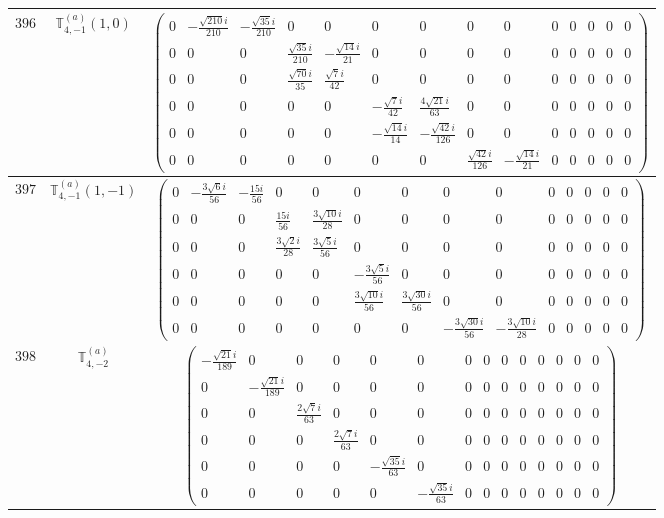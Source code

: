 \documentclass[fleqn,8pt,landscape]{jsarticle}
\begin{document}
\begin{center}
\begin{longtable}{ccc}
$ 396 $ & $ \mathbb{T}_{4,-1}^{(a)}(1,0) $ & $ \begin{pmatrix} 0 & - \frac{\sqrt{210} i}{210} & - \frac{\sqrt{35} i}{210} & 0 & 0 & 0 & 0 & 0 & 0 & 0 & 0 & 0 & 0 & 0 \\ 0 & 0 & 0 & \frac{\sqrt{35} i}{210} & - \frac{\sqrt{14} i}{21} & 0 & 0 & 0 & 0 & 0 & 0 & 0 & 0 & 0 \\ 0 & 0 & 0 & \frac{\sqrt{70} i}{35} & \frac{\sqrt{7} i}{42} & 0 & 0 & 0 & 0 & 0 & 0 & 0 & 0 & 0 \\ 0 & 0 & 0 & 0 & 0 & - \frac{\sqrt{7} i}{42} & \frac{4 \sqrt{21} i}{63} & 0 & 0 & 0 & 0 & 0 & 0 & 0 \\ 0 & 0 & 0 & 0 & 0 & - \frac{\sqrt{14} i}{14} & - \frac{\sqrt{42} i}{126} & 0 & 0 & 0 & 0 & 0 & 0 & 0 \\ 0 & 0 & 0 & 0 & 0 & 0 & 0 & \frac{\sqrt{42} i}{126} & - \frac{\sqrt{14} i}{21} & 0 & 0 & 0 & 0 & 0 \end{pmatrix} $ \\ \hline
$ 397 $ & $ \mathbb{T}_{4,-1}^{(a)}(1,-1) $ & $ \begin{pmatrix} 0 & - \frac{3 \sqrt{6} i}{56} & - \frac{15 i}{56} & 0 & 0 & 0 & 0 & 0 & 0 & 0 & 0 & 0 & 0 & 0 \\ 0 & 0 & 0 & \frac{15 i}{56} & \frac{3 \sqrt{10} i}{28} & 0 & 0 & 0 & 0 & 0 & 0 & 0 & 0 & 0 \\ 0 & 0 & 0 & \frac{3 \sqrt{2} i}{28} & \frac{3 \sqrt{5} i}{56} & 0 & 0 & 0 & 0 & 0 & 0 & 0 & 0 & 0 \\ 0 & 0 & 0 & 0 & 0 & - \frac{3 \sqrt{5} i}{56} & 0 & 0 & 0 & 0 & 0 & 0 & 0 & 0 \\ 0 & 0 & 0 & 0 & 0 & \frac{3 \sqrt{10} i}{56} & \frac{3 \sqrt{30} i}{56} & 0 & 0 & 0 & 0 & 0 & 0 & 0 \\ 0 & 0 & 0 & 0 & 0 & 0 & 0 & - \frac{3 \sqrt{30} i}{56} & - \frac{3 \sqrt{10} i}{28} & 0 & 0 & 0 & 0 & 0 \end{pmatrix} $ \\ \hline
$ 398 $ & $ \mathbb{T}_{4,-2}^{(a)} $ & $ \begin{pmatrix} - \frac{\sqrt{21} i}{189} & 0 & 0 & 0 & 0 & 0 & 0 & 0 & 0 & 0 & 0 & 0 & 0 & 0 \\ 0 & - \frac{\sqrt{21} i}{189} & 0 & 0 & 0 & 0 & 0 & 0 & 0 & 0 & 0 & 0 & 0 & 0 \\ 0 & 0 & \frac{2 \sqrt{7} i}{63} & 0 & 0 & 0 & 0 & 0 & 0 & 0 & 0 & 0 & 0 & 0 \\ 0 & 0 & 0 & \frac{2 \sqrt{7} i}{63} & 0 & 0 & 0 & 0 & 0 & 0 & 0 & 0 & 0 & 0 \\ 0 & 0 & 0 & 0 & - \frac{\sqrt{35} i}{63} & 0 & 0 & 0 & 0 & 0 & 0 & 0 & 0 & 0 \\ 0 & 0 & 0 & 0 & 0 & - \frac{\sqrt{35} i}{63} & 0 & 0 & 0 & 0 & 0 & 0 & 0 & 0 \end{pmatrix} $ \\ \hline

\end{longtable}
\end{center}
\end{document}
